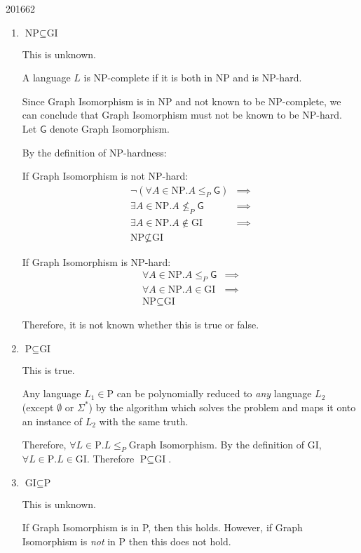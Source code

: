 \documentclass[10pt,\jkfside,a4paper]{article}
\begin{document}
\begin{examquestion}{2016}{6}{2}
\begin{enumerate}
\item $\text{NP} \subseteq \text{GI}$

This is unknown.

A language $L$ is NP-complete if it is both in NP and is NP-hard.

Since Graph Isomorphism is in NP and not known to be NP-complete, we can
conclude that Graph Isomorphism must not be known to be NP-hard. Let $\mathsf{G}$
denote Graph Isomorphism.

By the definition of NP-hardness:

If Graph Isomorphism is not NP-hard:
\begin{align*}
\neg (\forall A \in \text{NP}. A \le_P \mathsf{G}) & \implies \\
\exists A \in \text{NP}. A \not\le_P \mathsf{G} & \implies \\
\exists A \in \text{NP}. A \notin \text{GI} & \implies \\
\text{NP} \nsubseteq \text{GI}
\end{align*}

If Graph Isomorphism is NP-hard:
\begin{align*}
\forall A \in \text{NP}. A \le_P \mathsf{G} & \implies \\
\forall A \in \text{NP}. A \in \text{GI} & \implies \\
\text{NP} \subseteq \text{GI}
\end{align*}

Therefore, it is not known whether this is true or false.

\item $\text{P} \subseteq \text{GI}$

This is true.

Any language $L_1 \in \text{P}$ can be polynomially reduced to \textit{any}
language $L_2$ (except $\emptyset$ or $\Sigma^*$) by the algorithm which
solves the problem and maps it onto an instance of $L_2$ with the same truth.

Therefore, $\forall L \in \text{P}. L \le_P \text{Graph Isomorphism}$. By
the definition of GI, $\forall L \in \text{P}. L \in \text{GI}$.
Therefore $\text{P} \subseteq \text{GI}$.

\item $\text{GI} \subseteq \text{P}$

This is unknown.

If Graph Isomorphism is in P, then this holds. However, if Graph Isomorphism
is \textit{not} in P then this does not hold.

\end{enumerate}

\end{examquestion}
\end{document}
